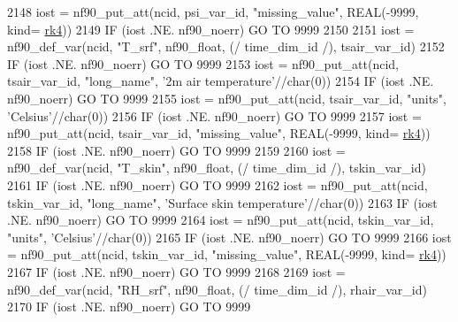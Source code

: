 \begin{DoxyCode}
{2148     iost    = nf90\_put\_att(ncid, psi\_var\_id, \textcolor{stringliteral}{"missing\_value"}, \textcolor{keywordtype}{REAL}(-9999, kind=
      \hyperlink{namespaceportable_abaed22a509442771d3fba69bebda0b33}{rk4}))
2149     \textcolor{keywordflow}{IF} (iost .NE. nf90\_noerr) \textcolor{keywordflow}{GO TO} 9999
2150 
2151     iost    = nf90\_def\_var(ncid, \textcolor{stringliteral}{"T\_srf"}, nf90\_float, (/ time\_dim\_id /), tsair\_var\_id)
2152     \textcolor{keywordflow}{IF} (iost .NE. nf90\_noerr) \textcolor{keywordflow}{GO TO} 9999
2153     iost    = nf90\_put\_att(ncid, tsair\_var\_id, \textcolor{stringliteral}{"long\_name"}, \textcolor{stringliteral}{'2m air temperature'}//char(0))
2154     \textcolor{keywordflow}{IF} (iost .NE. nf90\_noerr) \textcolor{keywordflow}{GO TO} 9999
2155     iost    = nf90\_put\_att(ncid, tsair\_var\_id, \textcolor{stringliteral}{"units"}, \textcolor{stringliteral}{'Celsius'}//char(0))
2156     \textcolor{keywordflow}{IF} (iost .NE. nf90\_noerr) \textcolor{keywordflow}{GO TO} 9999
2157     iost    = nf90\_put\_att(ncid, tsair\_var\_id, \textcolor{stringliteral}{"missing\_value"}, \textcolor{keywordtype}{REAL}(-9999, kind=
      \hyperlink{namespaceportable_abaed22a509442771d3fba69bebda0b33}{rk4}))
2158     \textcolor{keywordflow}{IF} (iost .NE. nf90\_noerr) \textcolor{keywordflow}{GO TO} 9999
2159 
2160     iost    = nf90\_def\_var(ncid, \textcolor{stringliteral}{"T\_skin"}, nf90\_float, (/ time\_dim\_id /), tskin\_var\_id)
2161     \textcolor{keywordflow}{IF} (iost .NE. nf90\_noerr) \textcolor{keywordflow}{GO TO} 9999
2162     iost    = nf90\_put\_att(ncid, tskin\_var\_id, \textcolor{stringliteral}{"long\_name"}, \textcolor{stringliteral}{'Surface skin temperature'}//char(0))
2163     \textcolor{keywordflow}{IF} (iost .NE. nf90\_noerr) \textcolor{keywordflow}{GO TO} 9999
2164     iost    = nf90\_put\_att(ncid, tskin\_var\_id, \textcolor{stringliteral}{"units"}, \textcolor{stringliteral}{'Celsius'}//char(0))
2165     \textcolor{keywordflow}{IF} (iost .NE. nf90\_noerr) \textcolor{keywordflow}{GO TO} 9999
2166     iost    = nf90\_put\_att(ncid, tskin\_var\_id, \textcolor{stringliteral}{"missing\_value"}, \textcolor{keywordtype}{REAL}(-9999, kind=
      \hyperlink{namespaceportable_abaed22a509442771d3fba69bebda0b33}{rk4}))
2167     \textcolor{keywordflow}{IF} (iost .NE. nf90\_noerr) \textcolor{keywordflow}{GO TO} 9999
2168 
2169     iost    = nf90\_def\_var(ncid, \textcolor{stringliteral}{"RH\_srf"}, nf90\_float, (/ time\_dim\_id /), rhair\_var\_id)
2170     \textcolor{keywordflow}{IF} (iost .NE. nf90\_noerr) \textcolor{keywordflow}{GO TO} 9999
}
\end{DoxyCode}

